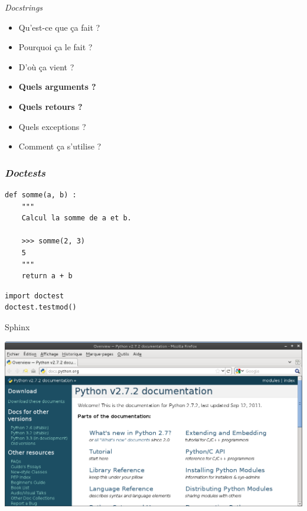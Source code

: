 \documentclass[xcolor=pdftex,dvipsnames,table,handout]{beamer}
\begin{document}
\begin{frame}{\textit{Docstrings}}
\begin{itemize}
\item Qu'est-ce que ça fait ?
\item Pourquoi ça le fait ?
\item D'où ça vient ?
\item \textbf{Quels arguments ?}
\item \textbf{Quels retours ?}
\item Quels exceptions ?
\item Comment ça s'utilise ?
\end{itemize}
\end{frame}

\begin{frame}[fragile]
\frametitle{\textit{Doctests}}
\begin{lstlisting}
def somme(a, b) :
    """
    Calcul la somme de a et b.
    
    >>> somme(2, 3)
    5
    """
    return a + b
\end{lstlisting}
\begin{lstlisting}
import doctest
doctest.testmod()
\end{lstlisting}
\end{frame}

\begin{frame}{Sphinx}
\begin{center}
\includegraphics[width=\linewidth]{img/Capture-Python}
\end{center}
\end{frame}
\end{document}
